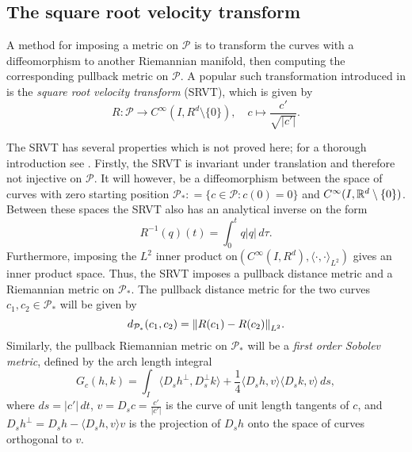 \subsection{The square root velocity transform}
A method for imposing a metric on \(\mathcal{P}\) is to transform the curves with a diffeomorphism to another Riemannian manifold, then computing the corresponding pullback metric on \(\mathcal{P}\). A popular such transformation introduced in \cite{srivastava2011_srvt} is the \emph{square root velocity transform} (SRVT), which is given by 
\begin{equation}\label{eq:SRVT}
  R :\mathcal{P} \rightarrow C^{\infty}(I, R^d \setminus \{0\}), \quad c \mapsto \frac{c'}{\sqrt{\vert c' \vert}}.
\end{equation} 

The SRVT has several properties which is not proved here; for a thorough introduction see \cite{bruveris1016_srvtexample,bauer2014_rprop}. Firstly, the SRVT is invariant under translation and therefore not injective on \(\mathcal{P}\). It will however, be a diffeomorphism between the space of curves with zero starting position \(\mathcal{P}_* : = \{c \in \mathcal{P}: c(0) = 0\} \) and \(C^{\infty}(I, \mathbb{R}^d \setminus \{0\})\). Between these spaces the SRVT also has an analytical inverse on the form 
\begin{equation}
  R^{-1}(q)(t) = \int_0 ^t q \vert q\vert \,d\tau.
\end{equation}
Furthermore, imposing the \(L^2\) inner product on\((C^{\infty}(I, R^d), \langle \cdot , \cdot \rangle_{L^2} )\) gives an inner product space. Thus, the SRVT imposes a pullback distance metric and a Riemannian metric on \(\mathcal{P}_*\). The pullback distance metric for the two curves \(c_1, c_2 \in \mathcal{P}_*\) will be given by 
\begin{equation}\label{eq:sob_pullback_dist}
  d_{\mathcal{P}_*}(c_1, c_2) = \norm{R(c_1) - R(c_2)}_{L^2}.
\end{equation}
Similarly, the pullback Riemannian metric on \(\mathcal{P}_*\) will be a \emph{first order Sobolev metric}, defined by the arch length integral
\begin{equation}
  G_c(h,k) = \int_I \langle D_s h^\perp ,D_s^\perp k \rangle+\frac{1}{4}\langle D_s h,v\rangle \langle D_s k,v\rangle \,ds,
\end{equation}
where \(ds = \vert c' \vert\,dt\), \(v = D_s c = \frac{c'}{\vert c'\vert}\) is the curve of unit length tangents of \(c\), and \(D_s h^\perp = D_s h  - \langle D_s h,v\rangle v\) is the projection of \(D_s h\) onto the space of curves orthogonal to \(v\). 

